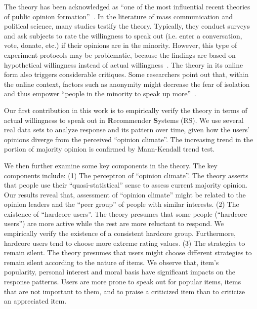\documentclass[sigconf]{acmart}
\begin{document}
The theory has been acknowledged as ``one of the most influential recent theories of public opinion formation''~\cite{Kennamer1990Self}. In the literature of mass communication and political science, many studies testify the theory. Typically, they conduct surveys and ask subjects to rate the willingness to speak out (i.e. enter a conversation, vote, donate, etc.) if their opinions are in the minority. However, this type of experiment protocols may be problematic, because the findings are based on hypothetical willingness instead of actual willingness~\cite{Carroll1997Perceived}. The theory in its online form also triggers considerable critiques. Some researchers point out that, within the online context, factors such as anonymity might decrease the fear of isolation and thus empower ``people in the minority to speak up more''~\cite{mcdevitt2003spiral}.

Our first contribution in this work is to empirically verify the theory in terms of actual willingness to speak out in \textbf{R}ecommender \textbf{S}ystems (RS). We use several real data sets to analyze response and its pattern over time, given how the users' opinions diverge from the perceived ``opinion climate''. The increasing trend in the portion of majority opinion is confirmed by Mann-Kendall trend test. 

We then further examine some key components in the theory. The key components include: (1) The perceptron of ``opinion climate''. The theory asserts that people use their ``quasi-statistical'' sense to assess current majority opinion. Our results reveal that, assessment of ``opinion climate'' might be related to the opinion leaders and the ``peer group'' of people with similar interests. (2) The existence of ``hardcore users''. The theory presumes that some people (``hardcore users'') are more active while the rest are more reluctant to respond. We empirically verify the existence of a consistent hardcore group. Furthermore, hardcore users tend to choose more extreme rating values. (3) The strategies to remain silent. The theory presumes that users might choose different strategies to remain silent according to the nature of items. We observe that, item's popularity, personal interest and moral basis have significant impacts on the response patterns. Users are more prone to speak out for popular items, items that are not important to them, and to praise a criticized item than to criticize an appreciated item.
\end{document}

